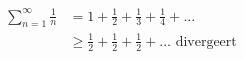 \documentclass[preview]{standalone}
\begin{document}
\begin{align*}
\sum_{n=1}^\infty\frac{1}{n}&=1+\frac{1}{2}+\frac{1}{3}+\frac{1}{4}+...\\&\geq\frac{1}{2}+\frac{1}{2}+\frac{1}{2}+...\text{ divergeert}
\end{align*}
\end{document}

